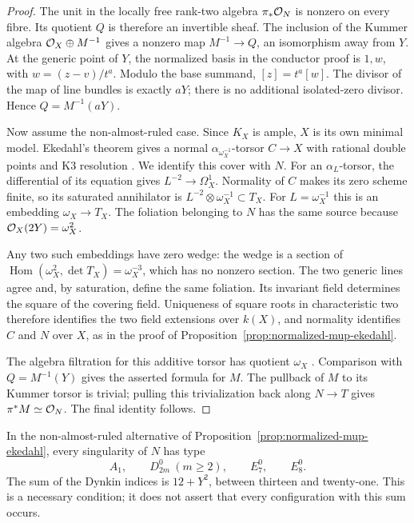 \begin{proof}
The unit in the locally free rank-two algebra $\pi_*\mathcal O_N$
is nonzero on every fibre. Its quotient $Q$ is therefore an
invertible sheaf. The inclusion of the Kummer algebra
$\mathcal O_X\oplus M^{-1}$ gives a nonzero map $M^{-1}\to Q$,
an isomorphism away from $Y$. At the generic point of $Y$,
the normalized basis in the conductor proof is $1,w$, with
$w=(z-v)/t^a$. Modulo the base summand, $[z]=t^a[w]$.
The divisor of the map of line bundles is exactly $aY$;
there is no additional isolated-zero divisor. Hence
$Q=M^{-1}(aY)$.

Now assume the non-almost-ruled case. Since $K_X$ is ample,
$X$ is its own minimal model. Ekedahl's theorem gives a normal
$\alpha_{\omega_X^{-1}}$-torsor $C\to X$ with rational double
points and K3 resolution
\cite[I, Theorem~2.4(ii)(d), p.~109]{EkedahlCanonical}.
We identify this cover with $N$. For an $\alpha_L$-torsor,
the differential of its equation gives $L^{-2}\to\Omega^1_X$.
Normality of $C$ makes its zero scheme finite, so its saturated
annihilator is $L^{-2}\otimes\omega_X^{-1}\subset T_X$.
For $L=\omega_X^{-1}$ this is an embedding $\omega_X\to T_X$.
The foliation belonging to $N$ has the same source because
$\mathcal O_X(2Y)=\omega_X^2$.

Any two such embeddings have zero wedge: the wedge is a section
of $\operatorname{Hom}(\omega_X^2,\det T_X)=\omega_X^{-3}$,
which has no nonzero section. The two generic lines agree and,
by saturation, define the same foliation. Its invariant field
determines the square of the covering field. Uniqueness of square
roots in characteristic two therefore identifies the two field
extensions over $k(X)$, and normality identifies $C$ and $N$
over $X$, as in the proof of
Proposition~\ref{prop:normalized-mup-ekedahl}.

The algebra filtration for this additive torsor has quotient
$\omega_X$ \cite[I, Proposition~1.7, p.~107]{EkedahlCanonical}.
Comparison with $Q=M^{-1}(Y)$ gives the asserted formula for
$M$. The pullback of $M$ to its Kummer torsor is trivial;
pulling this trivialization back along $N\to T$ gives
$\pi^*M\simeq\mathcal O_N$. The final identity follows.
\end{proof}

\begin{proposition}\label{prop:k3-picard-singularities}
In the non-almost-ruled alternative of
Proposition~\ref{prop:normalized-mup-ekedahl}, every singularity
of $N$ has type
\[
 A_1,\qquad D_{2m}^{0}\ (m\geq2),\qquad E_7^{0},\qquad E_8^{0}.
\]
The sum of the Dynkin indices is $12+Y^2$, between thirteen
and twenty-one. This is a necessary condition; it does not assert
that every configuration with this sum occurs.
\end{proposition}

